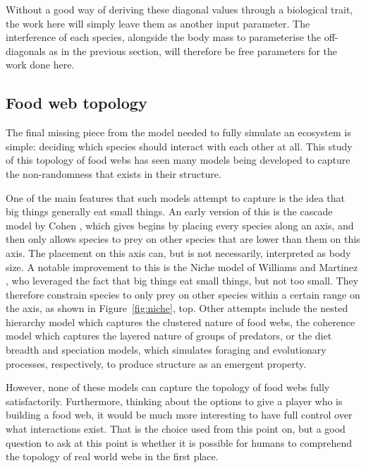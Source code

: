 Without a good way of deriving these diagonal values through a biological trait, the work here will simply leave them as another input parameter. The interference of each species, alongside the body mass to parameterise the off-diagonals as in the previous section, will therefore be free parameters for the work done here. 


\subsection{Food web topology}
\label{sec:topology}
The final missing piece from the model needed to fully simulate an ecosystem is simple: deciding which species should interact with each other at all.
This study of this topology of food webs has seen many models being developed to capture the non-randomness that exists in their structure.

One of the main features that such models attempt to capture is the idea that big things generally eat small things. An early version of this is the cascade model by Cohen \cite{Cohen2012}, which gives begins by placing every species along an axis, and then only allows species to prey on other species that are lower than them on this axis. The placement on this axis can, but is not necessarily, interpreted as body size.
A notable improvement to this is the Niche model of Williams and Martinez \cite{Williams2000}, who leveraged the fact that big things eat small things, but not too small. They therefore constrain species to only prey on other species within a certain range on the axis, as shown in Figure~\ref{fig:niche}, top.
Other attempts include the nested hierarchy model \cite{Cattin2004} which captures the clustered nature of food webs, the coherence model \cite{Johnson2014} which captures the layered nature of groups of predators, or the diet breadth \cite{Petchey2008} and speciation \cite{Rossberg2006} models, which simulates foraging and evolutionary processes, respectively, to produce structure as an emergent property. 

However, none of these models can capture the topology of food webs fully satisfactorily. Furthermore, thinking about the options to give a player who is building a food web, it would be much more interesting to have full control over what interactions exist. That is the choice used from this point on, but a good question to ask at this point is whether it is possible for humans to comprehend the topology of real world webs in the first place.

